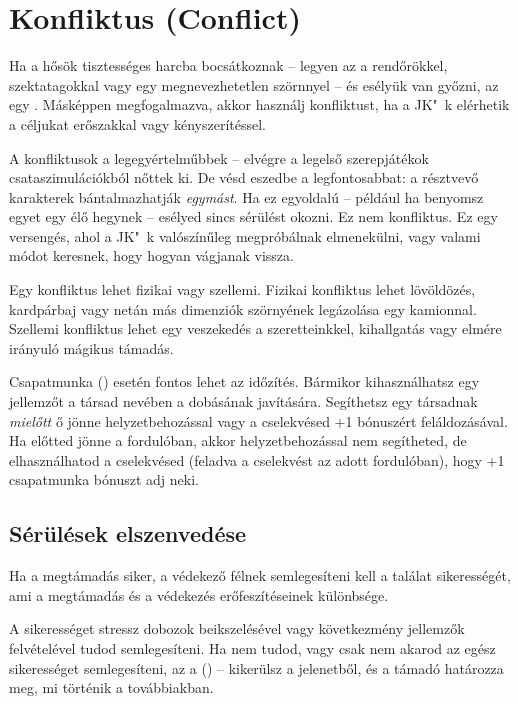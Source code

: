 \section[Konfliktus]{Konfliktus (Conflict)}

Ha a hősök tisztességes harcba bocsátkoznak -- legyen az a rendőrökkel, szektatagokkal vagy egy megnevezhetetlen szörnnyel -- és esélyük van győzni, az egy . Másképpen megfogalmazva, akkor használj konfliktust, ha a JK"~k elérhetik a céljukat erőszakkal vagy kényszerítéssel.

A konfliktusok a legegyértelműbbek -- elvégre a legelső szerepjátékok csataszimulációkból nőttek ki. De vésd eszedbe a legfontosabbat: a résztvevő karakterek bántalmazhatják \emph{egymást}. Ha ez egyoldalú -- például ha benyomsz egyet egy élő hegynek -- esélyed sincs sérülést okozni. Ez nem konfliktus. Ez egy versengés, ahol a JK"~k valószínűleg megpróbálnak elmenekülni, vagy valami módot keresnek, hogy hogyan vágjanak vissza.

Egy konfliktus lehet fizikai vagy szellemi. Fizikai konfliktus lehet lövöldözés, kardpárbaj vagy netán más dimenziók szörnyének legázolása egy kamionnal. Szellemi konfliktus lehet egy veszekedés a szeretteinkkel, kihallgatás vagy elmére irányuló mágikus támadás.

Csapatmunka () esetén fontos lehet az időzítés. Bármikor kihasználhatsz egy jellemzőt a társad nevében a dobásának javítására. Segíthetsz egy társadnak \emph{mielőtt} ő jönne helyzetbehozással vagy a cselekvésed +1 bónuszért feláldozásával. Ha előtted jönne a fordulóban, akkor helyzetbehozással nem segítheted, de elhasználhatod a cselekvésed (feladva a cselekvést az adott fordulóban), hogy +1 csapatmunka bónuszt adj neki.

\label{Sérülések elszenvedése}
\subsection{Sérülések elszenvedése}

Ha a megtámadás siker, a védekező félnek semlegesíteni kell a találat sikerességét, ami a megtámadás és a védekezés erőfeszítéseinek különbsége.

A sikerességet stressz dobozok beikszelésével vagy következmény jellemzők felvételével tudod semlegesíteni. Ha nem tudod, vagy csak nem akarod az egész sikerességet semlegesíteni, az a  () -- kikerülsz a jelenetből, és a támadó határozza meg, mi történik a továbbiakban.

